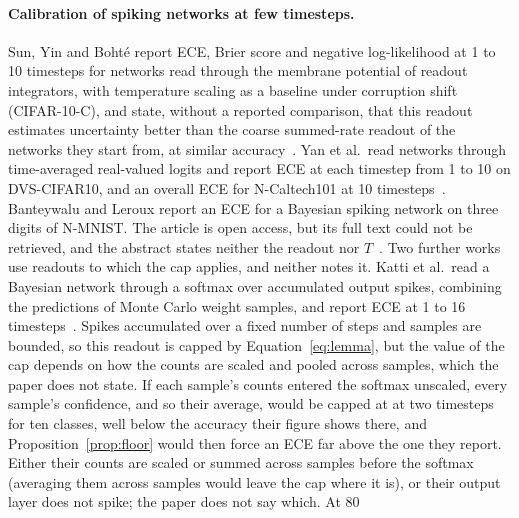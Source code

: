\documentclass[10pt]{article}
\begin{document}
\paragraph{Calibration of spiking networks at few timesteps.}
Sun, Yin and
Boht\'e report ECE, Brier score and negative log-likelihood at 1 to 10 timesteps for networks
read through the membrane potential of readout integrators, with temperature scaling as a
baseline under corruption shift (CIFAR-10-C), and state, without a reported comparison, that this readout estimates uncertainty
better than the coarse summed-rate readout of the networks they start from, at similar
accuracy~\citep{sun2023mcdropout}. Yan et al.\ read networks through time-averaged real-valued %
logits and report ECE at each timestep from 1 to 10 on DVS-CIFAR10, and an overall ECE for
N-Caltech101 at 10 timesteps~\citep{yan2025temporal}. Banteywalu and Leroux report an ECE for a %
Bayesian spiking network on three digits of N-MNIST. The article is open access, but its full text
could not be retrieved, and the abstract states neither the readout nor
$T$~\citep{banteywalu2026trustworthy}. %
Two further works use readouts %
to which the cap applies, and neither notes it. Katti et al.\ read a Bayesian network through a
softmax over accumulated output spikes, combining the predictions of Monte Carlo weight samples,
and report ECE at 1 to 16 timesteps~\citep{katti2024bayesian}. Spikes accumulated over a fixed %
number of steps and samples are bounded, so this readout is capped by
Equation~\eqref{eq:lemma}, but the value of the cap depends on how the counts are scaled and
pooled across samples, which the paper does not state. If each sample's counts entered the
softmax unscaled, every sample's confidence, and so their average, would be capped at
\ceilTenTwo{} at two timesteps for ten classes, well below the accuracy their figure shows %
there, and Proposition~\ref{prop:floor} would then force an ECE far above the one they report. %
Either their counts are scaled or summed across samples before the softmax (averaging them
across samples would leave the cap where it is), or their output layer does not spike; the paper
does not say which. At 80
\end{document}
